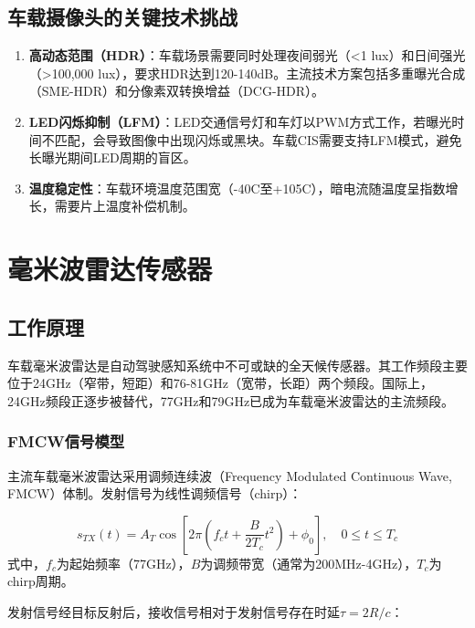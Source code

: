 \documentclass[12pt,a4paper,openany,UTF8]{ctexbook}
\begin{document}
\section{车载摄像头的关键技术挑战}

\begin{enumerate}
    \item \textbf{高动态范围（HDR）}：车载场景需要同时处理夜间弱光（<1 lux）和日间强光（>100,000 lux），要求HDR达到120-140dB。主流技术方案包括多重曝光合成（SME-HDR）和分像素双转换增益（DCG-HDR）。
    \item \textbf{LED闪烁抑制（LFM）}：LED交通信号灯和车灯以PWM方式工作，若曝光时间不匹配，会导致图像中出现闪烁或黑块。车载CIS需要支持LFM模式，避免长曝光期间LED周期的盲区。
    \item \textbf{温度稳定性}：车载环境温度范围宽（-40\textdegree C至+105\textdegree C），暗电流随温度呈指数增长，需要片上温度补偿机制。
\end{enumerate}

\clearpage

\chapter{毫米波雷达传感器}

\section{工作原理}

车载毫米波雷达是自动驾驶感知系统中不可或缺的全天候传感器。其工作频段主要位于24GHz（窄带，短距）和76-81GHz（宽带，长距）两个频段。国际上，24GHz频段正逐步被替代，77GHz和79GHz已成为车载毫米波雷达的主流频段。

\subsection{FMCW信号模型}

主流车载毫米波雷达采用调频连续波（Frequency Modulated Continuous Wave, FMCW）体制。发射信号为线性调频信号（chirp）：

\begin{equation}\label{eq:fmcw_tx}
s_{TX}(t) = A_T \cos\left[2\pi\left(f_c t + \frac{B}{2T_c} t^2\right) + \phi_0\right], \quad 0 \leq t \leq T_c
\end{equation}
式中，$f_c$为起始频率（77GHz），$B$为调频带宽（通常为200MHz-4GHz），$T_c$为chirp周期。

发射信号经目标反射后，接收信号相对于发射信号存在时延$\tau = 2R/c$：
\end{document}
